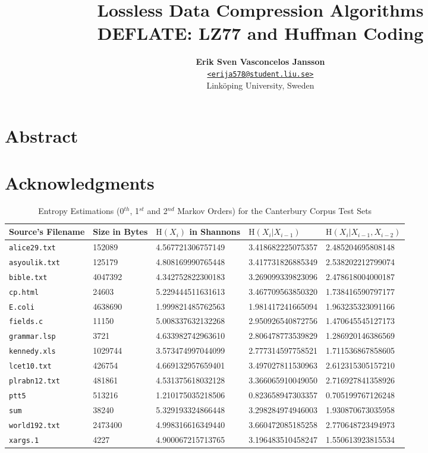 \documentclass[a4paper, twocolumn]{article}
\title{\textbf{Lossless Data Compression Algorithms \\
               DEFLATE: LZ77 and Huffman Coding}}
\author{{\textbf{Erik Sven Vasconcelos Jansson}} \\
        {\href{mailto:erija578@student.liu.se}
        {\texttt{<erija578@student.liu.se>}}} \\
        {Linköping University, Sweden}}
\begin{document}
    \maketitle
    \section*{Abstract}
    \section*{Acknowledgments}
    \tableofcontents \newpage

    \begin{table*}
        \centering
        \begin{tabular}{lllll}
        \toprule
            Source's Filename & Size in Bytes & $\mathrm{H}(X_i)$ in Shannons & $\mathrm{H}(X_i | X_{i-1})$ & $\mathrm{H}(X_i | X_{i-1}, X_{i-2})$ \\
        \midrule
            \texttt{alice29.txt} & 152089 & 4.567721306757149 & 3.418682225075357 & 2.485204695808148 \\
            \texttt{asyoulik.txt} & 125179 & 4.808169990765448 & 3.417731826885349 & 2.538202212799074 \\
            \texttt{bible.txt} & 4047392 & 4.342752822300183 & 3.269099339823096 & 2.478618004000187 \\
            \texttt{cp.html} & 24603 & 5.229444511631613 & 3.467709563850320 & 1.738416590797177 \\
            \texttt{E.coli} & 4638690 & 1.999821485762563 & 1.981417241665094 & 1.963235323091166 \\
            \texttt{fields.c} & 11150 & 5.008337632132268 & 2.950926540872756 & 1.470645545127173 \\
            \texttt{grammar.lsp} & 3721 & 4.633982742963610 & 2.806478773539829 & 1.286920146386569 \\
            \texttt{kennedy.xls} & 1029744 & 3.573474997044099 & 2.777314597758521 & 1.711536867858605 \\
            \texttt{lcet10.txt} & 426754 & 4.669132957659401 & 3.497027811530963 & 2.612315305157210 \\
            \texttt{plrabn12.txt} & 481861 & 4.531375618032128 & 3.366065910049050 & 2.716927841358926 \\
            \texttt{ptt5} & 513216 & 1.210175035218506 & 0.823658947303357 & 0.705199767126248 \\
            \texttt{sum} & 38240 & 5.329193324866448 & 3.298284974946003 & 1.930870673035958 \\
            \texttt{world192.txt} & 2473400 & 4.998316616349440 & 3.660472085185258 & 2.770648723494973 \\
            \texttt{xargs.1} & 4227 & 4.900067215713765 & 3.196483510458247 & 1.550613923815534 \\
        \bottomrule
        \end{tabular}
        \caption{Entropy Estimations (0$^{th}$, 1$^{st}$ and 2$^{nd}$ Markov Orders) for the Canterbury Corpus Test Sets}
        \label{tab:canterbury}
    \end{table*}

    \newpage %
    \nocite{*} %
    
    
\end{document}
